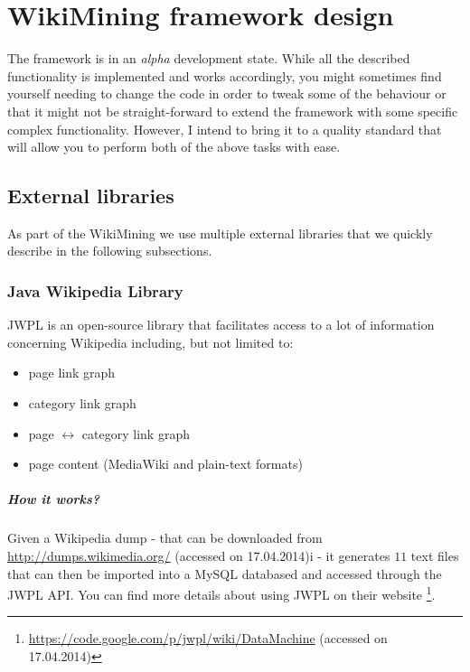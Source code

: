 \chapter{WikiMining framework design}
\label{cap:wikimining}

The framework is in an \emph{alpha} development state. While all the described
functionality is implemented and works accordingly, you might sometimes find
yourself needing to change the code in order to tweak some of the behaviour or
that it might not be straight-forward to extend the framework with some
specific complex functionality. However, I intend to bring it to a quality
standard that will allow you to perform both of the above tasks with ease.

\section{External libraries}

As part of the WikiMining we use multiple external libraries that we quickly
describe in the following subsections.

\subsection{Java Wikipedia Library}

\ac{JWPL} is an open-source library that facilitates access to a lot of
information concerning Wikipedia including, but not limited to:
\begin{itemize}
  \item page link graph
  \item category link graph
  \item page \(\leftrightarrow\) category link graph
  \item page content (MediaWiki and plain-text formats)
\end{itemize}

\paragraph{How it works?} Given a Wikipedia dump - that can be downloaded from
\url{http://dumps.wikimedia.org/} (accessed on 17.04.2014)i - it
generates \(11\) text files that can then be imported into a MySQL databased
and accessed through the \ac{JWPL} \ac{API}.
You can find more details about using \ac{JWPL} on their website
\footnote{\url{https://code.google.com/p/jwpl/wiki/DataMachine} (accessed on
17.04.2014) }.

